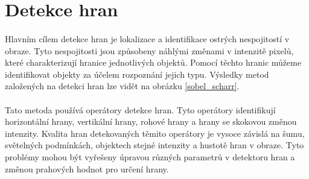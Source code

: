 \section{Detekce hran}
\label{detekce_hran}
\paragraph{} Hlavním cílem detekce hran je lokalizace a identifikace ostrých nespojitostí v obraze. Tyto nespojitosti jsou způsobeny náhlými změnami v intenzitě pixelů, které charakterizují hranice jednotlivých objektů. Pomocí těchto hranic můžeme identifikovat objekty za účelem rozpoznání jejich typu. Výsledky metod založených na detekci hran lze vidět na obrázku \ref{sobel_scharr}.
\paragraph{} Tato metoda používá operátory detekce hran. Tyto operátory identifikují horizontální hrany, vertikální hrany, rohové hrany a hrany se skokovou změnou intenzity. Kvalita hran detekovaných těmito operátory je vysoce závislá na šumu, světelných podmínkách, objektech stejné intenzity a hustotě hran v obraze. Tyto problémy mohou být vyřešeny úpravou různých parametrů v detektoru hran a změnou prahových hodnot pro určení hrany. 
